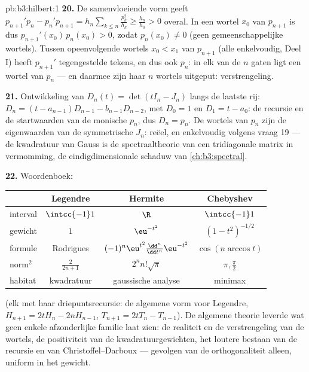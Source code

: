 \begin{solution}{pb:b3:hilbert:1}
\textbf{20.} De samenvloeiende vorm geeft $p_{n+1}'p_n -
p_n'p_{n+1} = h_n\sum_{k\leq n}\frac{p_k^2}{h_k} \geq
\frac{h_n}{h_0} > 0$ overal. In een wortel $x_0$ van $p_{n+1}$ is
dus $p_{n+1}'(x_0)\,p_n(x_0) > 0$, zodat $p_n(x_0) \neq 0$ (geen
gemeenschappelijke wortels). Tussen opeenvolgende wortels $x_0 <
x_1$ van $p_{n+1}$ (alle enkelvoudig, Deel I) heeft $p_{n+1}'$
tegengestelde tekens, en dus ook $p_n$: in elk van de $n$ gaten
ligt een wortel van $p_n$ --- en daarmee zijn haar $n$ wortels
uitgeput: verstrengeling.

\textbf{21.} Ontwikkeling van $D_n(t) = \det(tI_n - J_n)$ langs
de laatste rij: $D_n = (t - a_{n-1})D_{n-1} - b_{n-1}D_{n-2}$,
met $D_0 = 1$ en $D_1 = t - a_0$: de recursie en de startwaarden
van de monische $p_n$, dus $D_n = p_n$. De wortels van $p_n$ zijn
de eigenwaarden van de symmetrische $J_n$: reëel, en enkelvoudig
volgens vraag 19 --- de kwadratuur van Gauss is de spectraaltheorie
van een tridiagonale matrix in vermomming, de eindigdimensionale
schaduw van \cref{ch:b3:spectral}.

\textbf{22.} Woordenboek:
\begin{center}
\begin{tabular}{l|c|c|c}
 & Legendre & Hermite & Chebyshev\\
\hline
interval & $\intcc{-1}1$ & $\R$ & $\intcc{-1}1$\\
gewicht & $1$ & $\eu^{-t^2}$ & $(1-t^2)^{-1/2}$\\
formule & Rodrigues & $(-1)^n\eu^{t^2}
\frac{\dd^n}{\dd t^n}\eu^{-t^2}$ & $\cos(n\arccos t)$\\
norm$^2$ & $\frac2{2n+1}$ & $2^nn!\sqrt\pi$ & $\pi,
\frac\pi2$\\
habitat & kwadratuur & gaussische analyse & minimax\\
\end{tabular}
\end{center}
(elk met haar driepuntsrecursie: de algemene vorm voor Legendre,
$H_{n+1} = 2tH_n - 2nH_{n-1}$, $T_{n+1} = 2tT_n - T_{n-1}$). De
algemene theorie leverde wat geen enkele afzonderlijke familie
laat zien: de realiteit en de verstrengeling van de wortels, de
positiviteit van de kwadratuurgewichten, het loutere bestaan van
de recursie en van Christoffel--Darboux --- gevolgen van de
orthogonaliteit alleen, uniform in het gewicht.


\end{solution}
